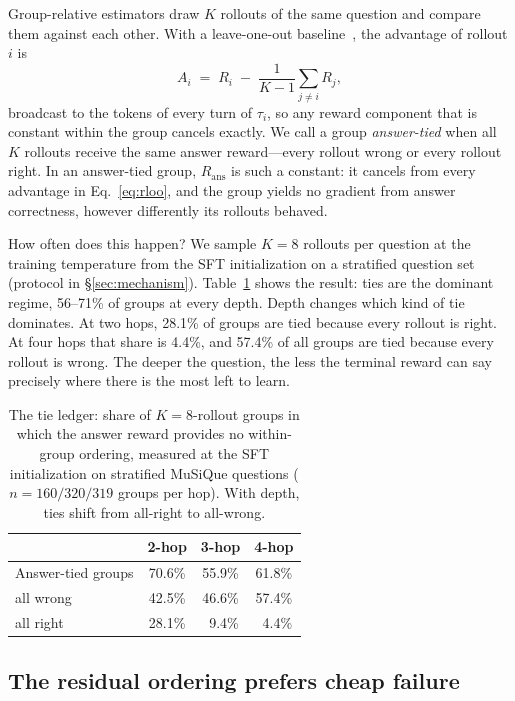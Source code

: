 Group-relative estimators draw $K$ rollouts of the same question and
compare them against each other. With a leave-one-out
baseline~\citep{kool2019buy,ahmadian2024rloo}, the advantage of rollout
$i$ is
\begin{equation}
A_i \;=\; R_i \;-\; \frac{1}{K-1}\sum_{j\neq i} R_j ,
\label{eq:rloo}
\end{equation}
broadcast to the tokens of every turn of $\tau_i$, so any reward
component that is constant within the group cancels exactly. We call a
group \emph{answer-tied} when all $K$ rollouts receive the same answer
reward---every rollout wrong or every rollout right. In an answer-tied
group, $R_{\mathrm{ans}}$ is such a constant: it cancels from every
advantage in Eq.~\ref{eq:rloo}, and the group yields no gradient from
answer correctness, however differently its rollouts behaved.

How often does this happen? We sample $K{=}8$ rollouts per question at
the training temperature from the SFT initialization on a stratified
question set (protocol in \S\ref{sec:mechanism}).
Table~\ref{tab:tie-ledger} shows the result: ties are the dominant
regime, 56--71\% of groups at every depth. Depth changes which kind of
tie dominates. At two hops, 28.1\% of groups are tied because every
rollout is right. At four hops that share is 4.4\%, and 57.4\% of all
groups are tied because every rollout is wrong. The deeper the
question, the less the terminal reward can say precisely where there
is the most left to learn.

\begin{table}[t]
\centering
\small
\begin{tabular}{lccc}
\toprule
 & 2-hop & 3-hop & 4-hop \\
\midrule
Answer-tied groups & 70.6\% & 55.9\% & 61.8\% \\
\quad all wrong    & 42.5\% & 46.6\% & 57.4\% \\
\quad all right    & 28.1\% & ~9.4\% & ~4.4\% \\
\bottomrule
\end{tabular}
\caption{The tie ledger: share of $K{=}8$-rollout groups in which
the answer reward provides no within-group ordering, measured at the
SFT initialization on stratified MuSiQue questions ($n{=}160/320/319$
groups per hop). With depth, ties shift from all-right to all-wrong.}
\label{tab:tie-ledger}
\end{table}

\subsection{The residual ordering prefers cheap failure}
\label{sec:starve-cost}

